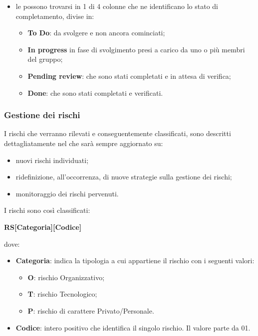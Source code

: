 \begin{itemize}
			\item le  possono trovarsi in 1 di 4 colonne che ne identificano lo stato di completamento, divise in:
			\begin{itemize}
				\item \textbf{To Do}:  da svolgere e non ancora cominciati;
				\item \textbf{In progress}  in fase di svolgimento presi a carico da uno o più membri del gruppo;
				\item \textbf{Pending review}:  che sono stati completati e in attesa di verifica;
				\item \textbf{Done}:  che sono stati completati e verificati.
			\end{itemize}
		\end{itemize}
		 \subsubsection{Gestione dei rischi}
		 I rischi che verranno rilevati e conseguentemente classificati, sono descritti dettagliatamente nel  che sarà sempre aggiornato su:
		 \begin{itemize}
		 	\item nuovi rischi individuati;
		 	\item ridefinizione, all'occorrenza, di nuove strategie sulla gestione dei rischi;
		 	\item monitoraggio dei rischi pervenuti.
		 \end{itemize}
	 	\noindent
	 	I rischi sono così classificati:
	 	\begin{center}
	 			{\bfseries RS[Categoria][Codice]}
	 	\end{center}
	 	dove:
	 	\begin{itemize}
	 		\item \textbf{Categoria}: indica la tipologia a cui appartiene il rischio con i seguenti valori:
	 	\begin{itemize}
	 		\item {\bfseries O}: rischio Organizzativo;
	 		\item {\bfseries T}: rischio Tecnologico;
	 		\item {\bfseries P}: rischio di carattere Privato/Personale. \\
	 	\end{itemize}
 			\item \textbf{Codice}: intero positivo che identifica il singolo rischio. Il valore parte da 01.
	 	\end{itemize}
 	\newpage
